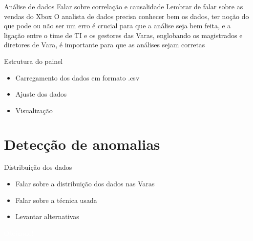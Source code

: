 \documentclass[10pt,t]{beamer}
\begin{document}
\begin{frame}{Análise de dados}
	\vspace{8pt}
	Falar sobre correlação e causalidade
	Lembrar de falar sobre as vendas do Xbox
    O analista de dados precisa conhecer bem os dados, ter noção do que pode ou não ser um erro é crucial para que a análise seja bem feita, e a ligação entre o time de TI e os gestores das Varas, englobando os magistrados e diretores de Vara, é importante para que as análises sejam corretas
\end{frame}

\begin{frame}{Estrutura do painel}
\vspace{8pt}
    \begin{itemize}
        \item Carregamento dos dados em formato .csv
        \item Ajuste dos dados
        \item Visualização
    \end{itemize}
\end{frame}

\section{Detecção de anomalias}

\begin{frame}{Distribuição dos dados}
	\vspace{8pt}
	\begin{itemize}
		\item Falar sobre a distribuição dos dados nas Varas
		\item Falar sobre a técnica usada
		\item Levantar alternativas
	\end{itemize}
\end{frame}


{

\begin{frame}[c,plain]{}
    \centering
    \textcolor{white}{Obrigado!}
\end{frame}

}
\end{document}
